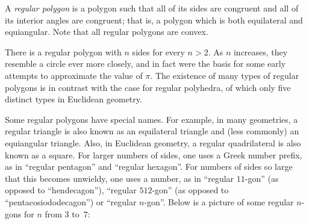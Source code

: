 \documentclass{article}
\begin{document}

A \emph{regular polygon} is a polygon such that all of its sides are congruent and all of its interior angles are congruent; that is, a polygon which is both equilateral and equiangular.  Note that all regular polygons are convex.

There is a regular polygon with $n$ sides for every $n>2$.  As $n$ increases, they resemble a circle ever more closely, and in fact were the basis for some early attempts to approximate the value of $\pi$.  The existence of many types of regular polygons is in contrast with the case for regular polyhedra, of which only five distinct types in Euclidean geometry.

Some regular polygons have special names.  For example, in many geometries, a regular triangle is also known as an equilateral triangle and (less commonly) an equiangular triangle.  Also, in Euclidean geometry, a regular quadrilateral is also known as a square.  For larger numbers of sides, one uses a Greek number prefix, as in ``regular pentagon'' and ``regular hexagon''.  For numbers of sides so large that this becomes unwieldy, one uses a number, as in ``regular $11$-gon'' (as opposed to ``hendecagon''), ``regular $512$-gon'' (as opposed to ``pentacosiododecagon'') or ``regular $n$-gon''. Below is a picture of some regular $n$-gons for $n$ from $3$ to~$7$:
\end{document}
